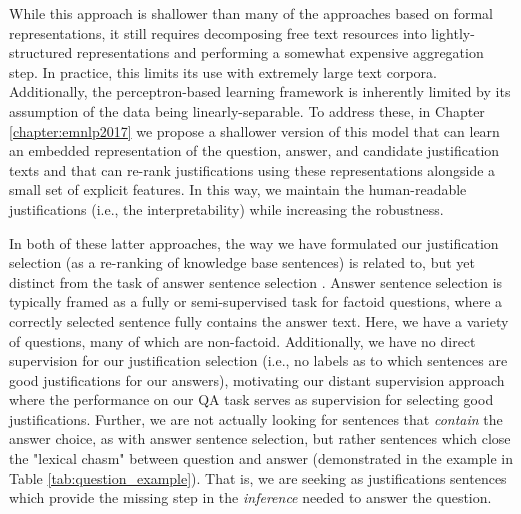 While this approach is shallower than many of the approaches based on formal representations, it still requires decomposing free text resources into lightly-structured representations and performing a somewhat expensive aggregation step.  In practice, this limits its use with extremely large text corpora.  Additionally, the perceptron-based learning framework is inherently limited by its assumption of the data being linearly-separable.  To address these, in Chapter \ref{chapter:emnlp2017} we propose a shallower version of this model that can learn an embedded representation of the question, answer, and candidate justification texts and that can re-rank justifications using these representations alongside a small set of explicit features.  In this way, we maintain the human-readable justifications (i.e., the interpretability) while increasing the robustness.

In both of these latter approaches, the way we have formulated our justification selection (as a re-ranking of knowledge base sentences) is related to, but yet distinct from the task of answer sentence selection \cite[][inter alia]{Wang2010ProbabilisticTM, Severyn:12,Severyn:13a,Severyn:13b,Severyn2015LearningTR,wang2015long}.  Answer sentence selection is typically framed as a fully or semi-supervised task for factoid questions, where a correctly selected sentence fully contains the answer text.
Here, we have a variety of questions, many of which are non-factoid.  Additionally, we have no direct supervision for our justification selection (i.e., no labels as to which sentences are good justifications for our answers), motivating our distant supervision approach where the performance on our QA task serves as supervision for selecting good justifications.  Further, we are not actually looking for sentences that \emph{contain} the answer choice, as with answer sentence selection, but rather sentences which close the "lexical chasm" \cite{Berger:00} between question and answer (demonstrated in the example in Table \ref{tab:question_example}).  That is, we are seeking as justifications sentences which provide the missing step in the \emph{inference} needed to answer the question.
